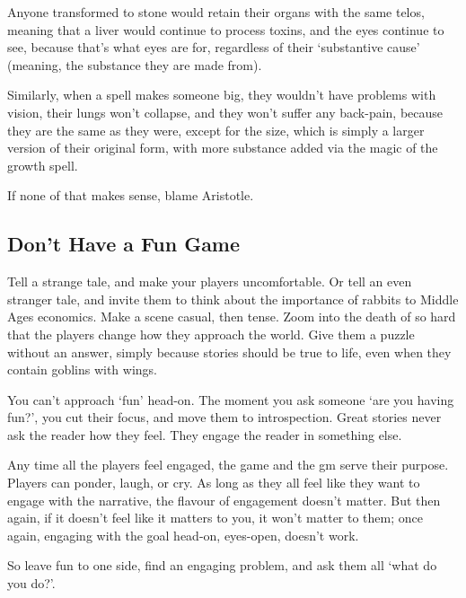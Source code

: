 \begin{multicols}{2}
Anyone transformed to stone would retain their organs with the same telos, meaning that a liver would continue to process toxins, and the eyes continue to see, because that's what eyes are for, regardless of their `substantive cause' (meaning, the substance they are made from).

Similarly, when a spell makes someone big, they wouldn't have problems with vision, their lungs won't collapse, and they won't suffer any back-pain, because they are the same as they were, except for the size, which is simply a larger version of their original form, with more substance added via the magic of the growth spell.

If none of that makes sense, blame Aristotle.

\subsection{Don't Have a Fun Game}

Tell a strange tale, and make your players uncomfortable.
Or tell an even stranger tale, and invite them to think about the importance of rabbits to Middle Ages economics.
Make a scene casual, then tense.
Zoom into the death of  so hard that the players change how they approach the world.
Give them a puzzle without an answer, simply because stories should be true to life, even when they contain goblins with wings.

You can't approach `fun' head-on.
The moment you ask someone `are you having fun?', you cut their focus, and move them to introspection.
Great stories never ask the reader how they feel.
They engage the reader in something else.

Any time all the players feel engaged, the game and the \gls{gm} serve their purpose.
Players can ponder, laugh, or cry.
As long as they all feel like they want to engage with the narrative, the flavour of engagement doesn't matter.
But then again, if it doesn't feel like it matters to you, it won't matter to them; once again, engaging with the goal head-on, eyes-open, doesn't work.

So leave fun to one side, find an engaging problem, and ask them all `what do you do?'.

\end{multicols}
